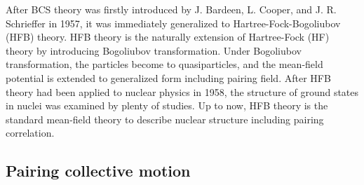 \documentclass[11pt]{book} %
\begin{document}
After BCS theory was firstly introduced by J. Bardeen, L. Cooper, and J. R. Schrieffer in 1957, it was immediately generalized to Hartree-Fock-Bogoliubov (HFB) theory. HFB theory is the naturally extension of Hartree-Fock (HF) theory by introducing Bogoliubov transformation. Under Bogoliubov transformation, the particles become to quasiparticles, and the mean-field potential is extended to generalized form including pairing field. After HFB theory had been applied to nuclear physics in 1958, the structure of ground states in nuclei was examined by plenty of studies. Up to now, HFB theory is the standard mean-field theory to describe nuclear structure including pairing correlation.






\subsection{Pairing collective motion}
\label{1-1-2}
\end{document}
